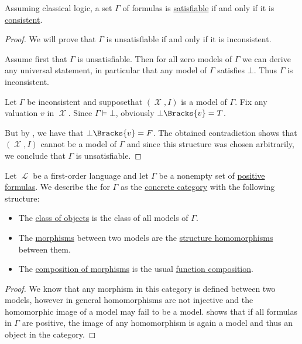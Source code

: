 \begin{proposition}\label{thm:formulas_satisfiable_iff_consistent}
  Assuming classical logic, a set \( \Gamma \) of formulas is \hyperref[def:propositional_semantics/satisfiability]{satisfiable} if and only if it is \hyperref[def:first_order_theory/consistent]{consistent}.
\end{proposition}
\begin{proof}
  We will prove that \( \Gamma \) is unsatisfiable if and only if it is inconsistent\DNE.

  \SufficiencySubProof Assume first that \( \Gamma \) is unsatisfiable. Then for all zero models of \( \Gamma \) we can derive any universal statement, in particular that any model of \( \Gamma \) satisfies \( \bot \). Thus \( \Gamma \) is inconsistent.

  \NecessitySubProof Let \( \Gamma \) be inconsistent and suppose\DNE that \( (\mscrX, I) \) is a model of \( \Gamma \). Fix any valuation \( v \) in \( \mscrX \). Since \( \Gamma \vDash \bot \), obviously \( \bot\Bracks{v} = T \).

  But by , we have that \( \bot\Bracks{v} = F \). The obtained contradiction shows that \( (\mscrX, I) \) cannot be a model of \( \Gamma \) and since this structure was chosen arbitrarily, we conclude that \( \Gamma \) is unsatisfiable.
\end{proof}

\begin{definition}\label{def:category_of_first_order_models}
  Let \( \mscrL \) be a first-order language and let \( \Gamma \) be a nonempty set of \hyperref[def:positive_formula]{positive formulas}. We describe the  for \( \Gamma \) as the \hyperref[def:concrete_category]{concrete category} with the following structure:
  \begin{itemize}
    \item The \hyperref[def:category/C1]{class of objects} is the class of all models of \( \Gamma \).

    \item The \hyperref[def:category/C2]{morphisms} between two models are the \hyperref[def:first_order_homomorphism]{structure homomorphisms} between them.

    \item The \hyperref[def:category/C3]{composition of morphisms} is the usual \hyperref[def:function/composition]{function composition}.
  \end{itemize}
\end{definition}
\begin{proof}
  We know that any morphism in this category is defined between two models, however in general homomorphisms are not injective and the homomorphic image of a model may fail to be a model.  shows that if all formulas in \( \Gamma \) are positive, the image of any homomorphism is again a model and thus an object in the category.
\end{proof}

